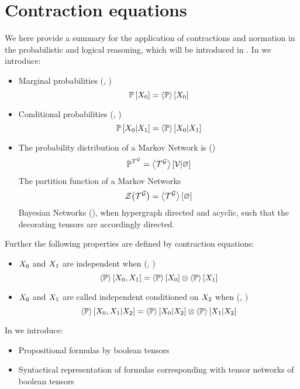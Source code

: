 \chapter{Contraction equations}

We here provide a summary for the application of contractions and normation in the probabilistic and logical reasoning, which will be introduced in .
In  we introduce:
\begin{itemize}
	\item Marginal probabilities (, )
		\[ \mathbb{P}\left[X_{0}\right] = \left\langle \mathbb{P}\right\rangle \left[ X_{0} \right] \]
	\item Conditional probabilities (, )
		\[ \mathbb{P}\left[X_{0}|X_{1}\right] = \left\langle \mathbb{P}\right\rangle \left[ X_{0} | X_{1} \right] \]
	\item The probability distribution of a Markov Network is ()
		\begin{align*}
			\mathbb{P}^{\mathcal{T}^{\mathcal{G}}} = \left\langle \mathcal{T}^{\mathcal{G}}\right\rangle \left[ \mathcal{V} | \varnothing \right]
		\end{align*}
		The partition function of a Markov Networks
		\begin{align*}
			\mathcal{Z}{\left(\mathcal{T}^{\mathcal{G}}\right)} = \left\langle \mathcal{T}^{\mathcal{G}}\right\rangle \left[ \varnothing \right]
		\end{align*}
		Bayesian Networks (), when hypergraph directed and acyclic, such that the decorating tensors are accordingly directed.
\end{itemize}

Further the following properties are defined by contraction equations:
\begin{itemize}
	\item $X_{0}$ and $X_{1}$ are independent when (, )
		\[  \left\langle \mathbb{P}\right\rangle \left[ X_{0},X_{1} \right]
		=  \left\langle \mathbb{P}\right\rangle \left[ X_{0} \right]
			\otimes  \left\langle \mathbb{P}\right\rangle \left[ X_{1} \right] \]
	\item $X_{0}$ and $X_{1}$ are called independent conditioned on $X_{2}$ when (, )
		\[ \left\langle \mathbb{P}\right\rangle \left[ X_{0},X_{1} | X_{2} \right]
		= \left\langle \mathbb{P}\right\rangle \left[ X_{0} | X_{2} \right]
		\otimes \left\langle \mathbb{P}\right\rangle \left[ X_{1} | X_{2} \right] \]
\end{itemize}

In  we introduce:
\begin{itemize}
	\item Propositional formulas by boolean tensors
	\item Syntactical representation of formulas corresponding with tensor networks of boolean tensors
\end{itemize}